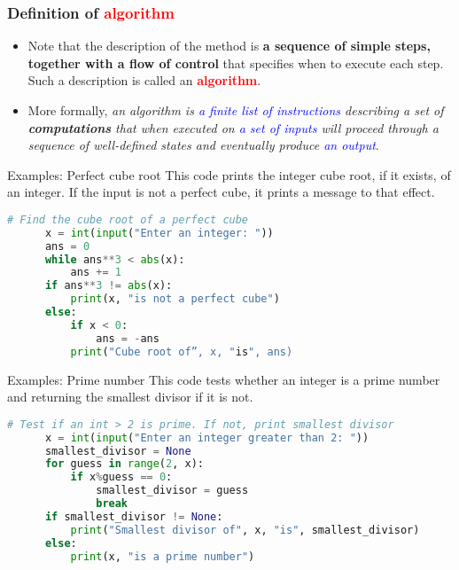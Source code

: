 \documentclass{sintefbeamer}
\begin{document}
\begin{frame}
  \frametitle{Definition of \textcolor{red}{algorithm}}

  \begin{itemize}[<+->]
    \item Note that the description of the method is \textbf{a sequence of simple steps, together with a flow of control} that specifies when to execute each step. Such a description is called an \textcolor{red}{\textbf{algorithm}}.\\[5pt]
    \item More formally, \textit{an algorithm is \textcolor{blue}{a finite list of instructions} describing a set of \textbf{computations} that when executed on \textcolor{blue}{a set of inputs} will proceed through a sequence of well-defined states and eventually produce \textcolor{blue}{an output}}.
  \end{itemize}

\end{frame}

\begin{frame}[fragile]{Examples: Perfect cube root}
  This code prints the integer cube root, if it exists, of an integer. If the input is not a perfect cube, it prints a message to that effect.

  \begin{block}{}
    \begin{lstlisting}[language=Python]
      # Find the cube root of a perfect cube
      x = int(input("Enter an integer: "))
      ans = 0
      while ans**3 < abs(x):
          ans += 1
      if ans**3 != abs(x):
          print(x, "is not a perfect cube")
      else:
          if x < 0:
              ans = -ans
          print("Cube root of”, x, "is", ans)
    \end{lstlisting}
  \end{block}
\end{frame}

\begin{frame}[fragile]{Examples: Prime number}
  This code tests whether an integer is a prime number and returning the smallest divisor if it is not.

  \begin{block}{}
    \begin{lstlisting}[language=Python]
      # Test if an int > 2 is prime. If not, print smallest divisor
      x = int(input("Enter an integer greater than 2: "))
      smallest_divisor = None
      for guess in range(2, x):
          if x%guess == 0:
              smallest_divisor = guess
              break
      if smallest_divisor != None:
          print("Smallest divisor of", x, "is", smallest_divisor)
      else:
          print(x, "is a prime number")
    \end{lstlisting}
  \end{block}
\end{frame}
\end{document}
